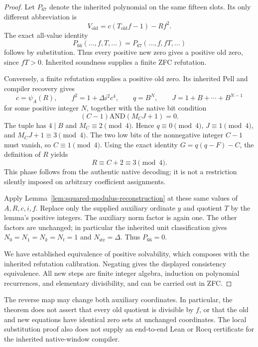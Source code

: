 \documentclass[11pt,letterpaper]{article}
\theoremstyle{remark}\newtheorem{remark}[theorem]{Remark}
\begin{document}
\begin{proof}
Let \(P_{67}\) denote the inherited polynomial on the same fifteen slots.
Its only different abbreviation is
\[
 V_{\mathrm{old}}=c(T_{\mathrm{old}}f-1)-Rf^2.
\]
The exact all-value identity
\begin{equation}
 P_{66}(\ldots,f,T,\ldots)
   =P_{67}(\ldots,f,fT,\ldots)
 \label{eq:p66-pullback}
\end{equation}
follows by substitution.  Thus every positive new zero gives a positive old
zero, since \(fT>0\).  Inherited soundness supplies a finite ZFC refutation.

Conversely, a finite refutation supplies a positive old zero.  Its inherited
Pell and compiler recovery gives
\[
 c=\psi_A(R),\qquad f^2=1+\Delta i^2c^4,
 \qquad q=B^N,\qquad J=1+B+\cdots+B^{N-1}
\]
for some positive integer \(N\), together with the native bit condition
\[
 (C-1)\mathbin{\mathrm{AND}}(M_CJ+1)=0.
\]
The tuple has \(4\mid B\) and \(M_C\equiv2\pmod4\).  Hence
\(q\equiv0\pmod4\), \(J\equiv1\pmod4\), and
\(M_CJ+1\equiv3\pmod4\).  The two low bits of the nonnegative integer
\(C-1\) must vanish, so \(C\equiv1\pmod4\).  Using the exact identity
\(G=q(q-F)-C\), the definition of \(R\) yields
\[
 R\equiv C+2\equiv3\pmod4.
\]
This phase follows from the authentic native decoding; it is not a
restriction silently imposed on arbitrary coefficient assignments.

Apply Lemma~\ref{lem:squared-modulus-reconstruction} at these same values
of \(A,R,c,i,f\).  Replace only the supplied auxiliary ordinate \(y\) and
quotient \(T\) by the lemma's positive integers.  The auxiliary norm factor
is again one.  The other factors are unchanged; in particular the inherited
unit classification gives \(N_0=N_1=N_k=N_t=1\) and
\(N_{\mathrm{str}}=\Delta\).  Thus \(P_{66}=0\).

We have established equivalence of positive solvability, which composes
with the inherited refutation calibration.  Negating gives the displayed
consistency equivalence.  All new steps are finite integer algebra,
induction on polynomial recurrences, and elementary divisibility, and can
be carried out in ZFC.
\end{proof}

The reverse map may change both auxiliary coordinates.  In particular,
the theorem does not assert that every old quotient is divisible by \(f\),
or that the old and new equations have identical zero sets at unchanged
coordinates.  The local substitution proof also does not supply an
end-to-end Lean or Rocq certificate for the inherited native-window
compiler.
\end{document}
